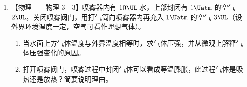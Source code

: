 \documentclass[\gkver]{gaokaozhenti}
\begin{document}
\begin{enumerate}
{在 $2t_{0}\sim3t_{0}$ 时间内，粒子做初速度为 $v_{1}$ 的匀加速直线运动，设位移大小为 $s_{2}$，则
\[ s_{2}=v_{1}t_{0}+\frac{1}{2}at_{0}^{2}, \]
解得 $s_{2}=\frac{3}{5}h$。

由于 $s_{1}+s_{2}<h$，所以粒子在 $3t_{0}\sim4t_{0}$ 时间内继续做匀速圆周运动，设速度大小为 $v_{2}$，半径为 $R_{2}$，则
\[ v_{2}=v_{1}+at_{0},\qquad qv_{2}B_{0}=\frac{mv_{2}^{2}}{R_{2}}, \]
解得 $R_{2}=\frac{2h}{5\pi}$。由于 $s_{1}+s_{2}+R_{2}<h$，粒子恰好又完成一个周期的圆周运动；在 $4t_{0}\sim5t_{0}$ 时间内，粒子运动到正极板。因此粒子运动的最大半径 $R_{2}=\frac{2h}{5\pi}$。

（3）粒子在板间运动的轨迹如图所示。

}

\item
【物理——物理 3—3】喷雾器内有 $10\UL$ 水，上部封闭有 $1\Uatm$ 的空气 $2\UL$。关闭喷雾阀门，用打气筒向喷雾器内再充入 $1\Uatm$ 的空气 $3\UL$（设外界环境温度一定，空气可看作理想气体）。

\begin{enumerate}
	\item
	当水面上方气体温度与外界温度相等时，求气体压强，并从微观上解释气体压强变化的原因。
	\item
	打开喷雾阀门，喷雾过程中封闭气体可以看成等温膨胀，此过程气体是吸热还是放热？简要说明理由。
\end{enumerate}





\end{enumerate}
\end{document}
